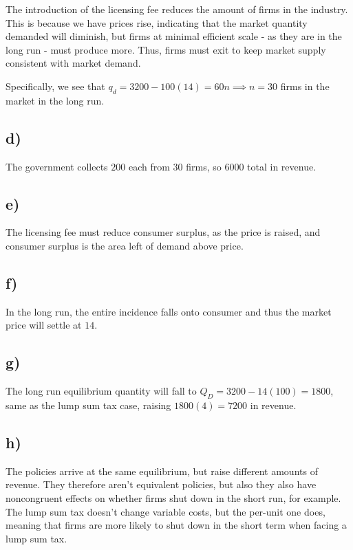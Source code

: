 \documentclass[12pt,letterpaper]{article}
\theoremstyle{definition}
\begin{document}
The introduction of the licensing fee reduces the amount of firms in the
industry. This is because we have prices rise, indicating that the market
quantity demanded will diminish, but firms at minimal efficient scale - as they
are in the long run - must produce more. Thus, firms must exit to keep market
supply consistent with market demand.

Specifically, we see that $q_d = 3200 - 100(14) = 60n \implies n = 30$ firms in
the market in the long run.

\subsection*{d)}

The government collects $200$ each from $30$ firms, so $6000$ total in revenue.

\subsection*{e)}

The licensing fee must reduce consumer surplus, as the price is raised, and
consumer surplus is the area left of demand above price. 

\subsection*{f)}

In the long run, the entire incidence falls onto consumer and thus the market
price will settle at $14$.

\subsection*{g)}

The long run equilibrium quantity will fall to $Q_D = 3200 - 14(100) = 1800$,
same as the lump sum tax case, raising $1800(4) = 7200$ in revenue.

\subsection*{h)}

The policies arrive at the same equilibrium, but raise different amounts of
revenue. They therefore aren't equivalent policies, but also they also have
noncongruent effects on whether firms shut down in the short run, for example.
The lump sum tax doesn't change variable costs, but the per-unit one does,
meaning that firms are more likely to shut down in the short term when facing a
lump sum tax.
\end{document}
